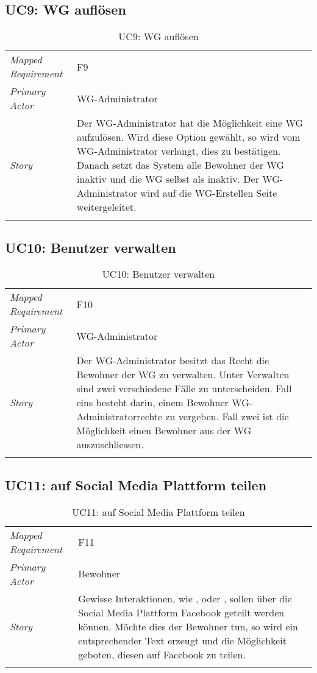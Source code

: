 \subsection{UC9: WG auflösen}\label{subsec:uc9}
\begin{table}[H]
	\tablestyle
	\tablealtcolored
	\begin{tabularx}{\textwidth}{lX}
		\tablebody
			\textit{Mapped Requirement} &
			F9
			\tabularnewline
			\textit{Primary Actor} &
			WG-Administrator
			\tabularnewline
			\textit{Story} &
			Der WG-Administrator hat die Möglichkeit eine WG aufzulösen. Wird diese Option gewählt, so wird vom WG-Administrator verlangt, dies zu bestätigen. Danach setzt das System alle Bewohner der WG inaktiv und die WG selbst als inaktiv. Der WG-Administrator wird auf die WG-Erstellen Seite weitergeleitet.
			\tabularnewline
		\tableend
	\end{tabularx}
	\caption{UC9: WG auflösen}
\end{table}


\subsection{UC10: Benutzer verwalten}\label{subsec:uc10}
\begin{table}[H]
	\tablestyle
	\tablealtcolored
	\begin{tabularx}{\textwidth}{lX}
		\tablebody
			\textit{Mapped Requirement} &
			F10
			\tabularnewline
			\textit{Primary Actor} &
			WG-Administrator
			\tabularnewline
			\textit{Story} &
			Der WG-Administrator besitzt das Recht die Bewohner der WG zu verwalten. Unter Verwalten sind zwei verschiedene Fälle zu unterscheiden. Fall eins besteht darin, einem Bewohner WG-Administratorrechte zu vergeben. Fall zwei ist die Möglichkeit einen Bewohner aus der WG auszuschliessen.
			\tabularnewline
		\tableend
	\end{tabularx}
	\caption{UC10: Benutzer verwalten}
\end{table}


\subsection{UC11: auf Social Media Plattform teilen}\label{subsec:uc11}
\begin{table}[H]
	\tablestyle
	\tablealtcolored
	\begin{tabularx}{\textwidth}{lX}
		\tablebody
			\textit{Mapped Requirement} &
			F11
			\tabularnewline
			\textit{Primary Actor} &
			Bewohner
			\tabularnewline
			\textit{Story} &
			Gewisse Interaktionen, wie \nameref{subsec:uc3}, \nameref{subsec:uc7} oder \nameref{subsec:uc8}, sollen über die Social Media Plattform Facebook geteilt werden können. Möchte dies der Bewohner tun, so wird ein entsprechender Text erzeugt und die Möglichkeit geboten, diesen auf Facebook zu teilen.
			\tabularnewline
		\tableend
	\end{tabularx}
	\caption{UC11: auf Social Media Plattform teilen}
\end{table}
